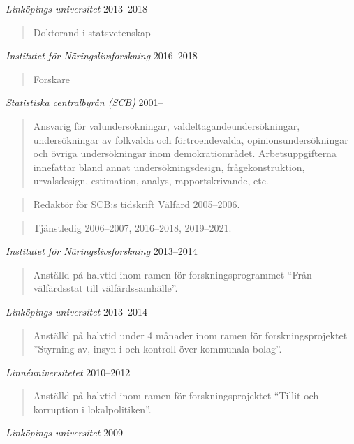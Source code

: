 \documentclass[11pt,]{article}
\begin{document}
\emph{Linköpings universitet} \hfill 2013--2018

\begin{quote}
Doktorand i statsvetenskap
\end{quote}

\emph{Institutet för Näringslivsforskning} \hfill 2016--2018

\begin{quote}
Forskare
\end{quote}

\emph{Statistiska centralbyrån (SCB)} \hfill 2001--

\begin{quote}
Ansvarig för valundersökningar, valdeltagandeundersökningar,
undersökningar av folkvalda och förtroendevalda, opinionsundersökningar
och övriga undersökningar inom demokratiområdet. Arbetsuppgifterna
innefattar bland annat undersökningsdesign, frågekonstruktion,
urvalsdesign, estimation, analys, rapportskrivande, etc.
\end{quote}

\begin{quote}
Redaktör för SCB:s tidskrift Välfärd 2005--2006.
\end{quote}

\begin{quote}
Tjänstledig 2006--2007, 2016--2018, 2019--2021.
\end{quote}

\emph{Institutet för Näringslivsforskning} \hfill 2013--2014

\begin{quote}
Anställd på halvtid inom ramen för forskningsprogrammet ``Från
välfärdsstat till välfärdssamhälle''.
\end{quote}

\emph{Linköpings universitet} \hfill 2013--2014

\begin{quote}
Anställd på halvtid under 4 månader inom ramen för forskningsprojektet
''Styrning av, insyn i och kontroll över kommunala bolag''.
\end{quote}

\emph{Linnéuniversitetet} \hfill 2010--2012

\begin{quote}
Anställd på halvtid inom ramen för forskningsprojektet ``Tillit och
korruption i lokalpolitiken''.
\end{quote}

\emph{Linköpings universitet} \hfill 2009
\end{document}
